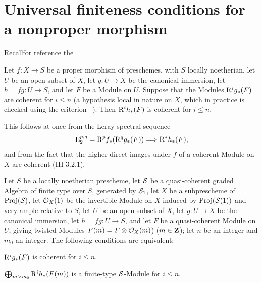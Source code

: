 \section[Universal finiteness conditions]
{Universal finiteness conditions for a nonproper morphism} \label{XII.5} Recall\pageoriginale for reference the \setcounter{equation}{25}

\begin{proposition} \label{XII.5.1}
Let $f:X\to S$ be a proper morphism of preschemes, with $S$ locally noetherian, let $U$ be an open subset of $X$, let $g:U\to X$ be the canonical immersion, let $h=fg:U\to S$, and let $F$ be a Module on $U$. Suppose that the Modules $\mathrm R^ig_\ast(F)$ are coherent for $i\leq n$ (a hypothesis local in nature on $X$, which in practice is checked using the criterion ~). Then $\mathrm R^ih_\ast(F)$ is coherent for $i\leq n$.
\end{proposition}

This follows at once from the Leray spectral sequence
\steco
\begin{equation} \label{eq:XII.26} {} \operatorname{E}_2^{p, q}=\mathrm R^pf_\ast(\mathrm R^qg_\ast(F)) \Longrightarrow \mathrm R^\ast h_\ast(F),
\end{equation}
and from the fact that the higher direct images under $f$ of a coherent Module on $X$ are coherent (\EGA III 3.2.1).

\begin{proposition} \label{XII.5.2}
Let $S$ be a locally noetherian prescheme, let $\mathcal S$ be a quasi-coherent graded Algebra of finite type over $S$, generated by $\mathcal S_1$, let $X$ be a subprescheme of $\operatorname{Proj}(\mathcal S)$, let $\mathcal O_X(1)$ be the invertible Module on $X$ induced by $\operatorname{Proj}(\mathcal S(1))$ and very ample relative to $S$, let $U$ be an open subset of $X$, let $g:U\to X$ be the canonical immersion, let $h=fg:U\to S$, and let $F$ be a quasi-coherent Module on $U$, giving twisted Modules $F(m)=F\otimes \mathcal O_X(m)$) ($m\in\mathbf Z$); let $n$ be an integer and $m_0$ an integer. The following conditions are equivalent:
\begin{enumeratei}
\item
$\mathrm R^ig_\ast(F)$ is coherent for $i\leq n$.
\item
$\bigoplus_{m>m_0}\mathrm R^ih_\ast(F(m))$ is a finite-type $\mathcal S$-Module for $i\leq n$.
\end{enumeratei}
\end{proposition}

